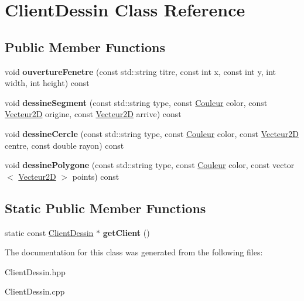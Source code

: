 \hypertarget{class_client_dessin}{}\section{Client\+Dessin Class Reference}
\label{class_client_dessin}
\subsection*{Public Member Functions}
\begin{DoxyCompactItemize}
\item 
\mbox{\label{class_client_dessin_a2db889a607c3e01fba6f1476fc392266}} 
void {\bfseries ouverture\+Fenetre} (const std\+::string titre, const int x, const int y, int width, int height) const
\item 
\mbox{\label{class_client_dessin_ab05b85b60ea0e929cc70bc17a8e2c915}} 
void {\bfseries dessine\+Segment} (const std\+::string type, const \mbox{\hyperlink{class_couleur}{Couleur}} color, const \mbox{\hyperlink{class_vecteur2_d}{Vecteur2D}} origine, const \mbox{\hyperlink{class_vecteur2_d}{Vecteur2D}} arrive) const
\item 
\mbox{\label{class_client_dessin_ab5dfd18b08002d61f458362e011e86a4}} 
void {\bfseries dessine\+Cercle} (const std\+::string type, const \mbox{\hyperlink{class_couleur}{Couleur}} color, const \mbox{\hyperlink{class_vecteur2_d}{Vecteur2D}} centre, const double rayon) const
\item 
\mbox{\label{class_client_dessin_a7f6c8cc590781399fda51786eb16a036}} 
void {\bfseries dessine\+Polygone} (const std\+::string type, const \mbox{\hyperlink{class_couleur}{Couleur}} color, const vector$<$ \mbox{\hyperlink{class_vecteur2_d}{Vecteur2D}} $>$ points) const
\end{DoxyCompactItemize}
\subsection*{Static Public Member Functions}
\begin{DoxyCompactItemize}
\item 
\mbox{\label{class_client_dessin_aa5c30f3bd7db80ed904fded4e43ec4e2}} 
static const \mbox{\hyperlink{class_client_dessin}{Client\+Dessin}} $\ast$ {\bfseries get\+Client} ()
\end{DoxyCompactItemize}


The documentation for this class was generated from the following files\+:\begin{DoxyCompactItemize}
\item 
Client\+Dessin.\+hpp\item 
Client\+Dessin.\+cpp\end{DoxyCompactItemize}
